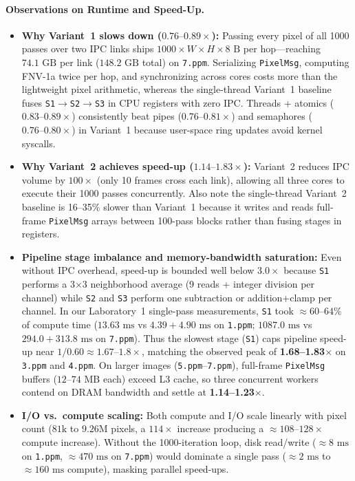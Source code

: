 \documentclass[10pt,a4paper]{article}
\begin{document}
\paragraph{Observations on Runtime and Speed-Up.}
\begin{itemize}
    \item \textbf{Why Variant~1 slows down ($0.76\text{--}0.89\times$):} Passing every pixel of all 1000 passes over two IPC links ships $1000 \times W \times H \times 8\text{ B}$ per hop---reaching $74.1\text{ GB}$ per link ($148.2\text{ GB}$ total) on \texttt{7.ppm}. Serializing \texttt{PixelMsg}, computing FNV-1a twice per hop, and synchronizing across cores costs more than the lightweight pixel arithmetic, whereas the single-thread Variant~1 baseline fuses \texttt{S1}$\to$\texttt{S2}$\to$\texttt{S3} in CPU registers with zero IPC. Threads + atomics ($0.83\text{--}0.89\times$) consistently beat pipes ($0.76\text{--}0.81\times$) and semaphores ($0.76\text{--}0.80\times$) in Variant~1 because user-space ring updates avoid kernel syscalls.
    \item \textbf{Why Variant~2 achieves speed-up ($1.14\text{--}1.83\times$):} Variant~2 reduces IPC volume by $100\times$ (only 10 frames cross each link), allowing all three cores to execute their 1000 passes concurrently. Also note the single-thread Variant~2 baseline is 16--35\% slower than Variant~1 because it writes and reads full-frame \texttt{PixelMsg} arrays between 100-pass blocks rather than fusing stages in registers.
    \item \textbf{Pipeline stage imbalance and memory-bandwidth saturation:} Even without IPC overhead, speed-up is bounded well below $3.0\times$ because \texttt{S1} performs a 3$\times$3 neighborhood average (9 reads + integer division per channel) while \texttt{S2} and \texttt{S3} perform one subtraction or addition+clamp per channel. In our Laboratory~1 single-pass measurements, \texttt{S1} took $\approx 60\text{--}64\%$ of compute time ($13.63\text{ ms}$ vs $4.39+4.90\text{ ms}$ on \texttt{1.ppm}; $1087.0\text{ ms}$ vs $294.0+313.8\text{ ms}$ on \texttt{7.ppm}). Thus the slowest stage (\texttt{S1}) caps pipeline speed-up near $1/0.60 \approx 1.67\text{--}1.8\times$, matching the observed peak of \textbf{1.68--1.83$\times$} on \texttt{3.ppm} and \texttt{4.ppm}. On larger images (\texttt{5.ppm}--\texttt{7.ppm}), full-frame \texttt{PixelMsg} buffers ($12\text{--}74\text{ MB}$ each) exceed L3 cache, so three concurrent workers contend on DRAM bandwidth and settle at \textbf{1.14--1.23$\times$}.
    \item \textbf{I/O vs.\ compute scaling:} Both compute and I/O scale linearly with pixel count ($81\text{k}$ to $9.26\text{M}$ pixels, a $114\times$ increase producing a $\approx 108\text{--}128\times$ compute increase). Without the 1000-iteration loop, disk read/write ($\approx 8\text{ ms}$ on \texttt{1.ppm}, $\approx 470\text{ ms}$ on \texttt{7.ppm}) would dominate a single pass ($\approx 2\text{ ms}$ to $\approx 160\text{ ms}$ compute), masking parallel speed-ups.
\end{itemize}
\end{document}
